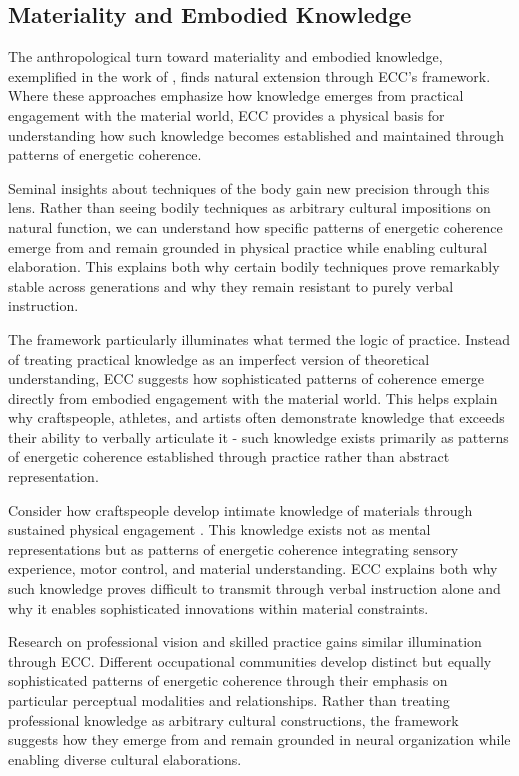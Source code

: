 \subsection{Materiality and Embodied Knowledge}

The anthropological turn toward materiality and embodied knowledge, exemplified in the work of \cite{ingold2013making,jackson1989knowledge,csordas1990embodiment}, finds natural extension through ECC's framework. Where these approaches emphasize how knowledge emerges from practical engagement with the material world, ECC provides a physical basis for understanding how such knowledge becomes established and maintained through patterns of energetic coherence.

Seminal insights about techniques of the body \cite{mauss1935techniques} gain new precision through this lens. Rather than seeing bodily techniques as arbitrary cultural impositions on natural function, we can understand how specific patterns of energetic coherence emerge from and remain grounded in physical practice while enabling cultural elaboration. This explains both why certain bodily techniques prove remarkably stable across generations and why they remain resistant to purely verbal instruction.

The framework particularly illuminates what \cite{bourdieu1990logic} termed the logic of practice. Instead of treating practical knowledge as an imperfect version of theoretical understanding, ECC suggests how sophisticated patterns of coherence emerge directly from embodied engagement with the material world. This helps explain why craftspeople, athletes, and artists often demonstrate knowledge that exceeds their ability to verbally articulate it - such knowledge exists primarily as patterns of energetic coherence established through practice rather than abstract representation.

Consider how craftspeople develop intimate knowledge of materials through sustained physical engagement \cite{bunn1999nomads,marchand2010making}. This knowledge exists not as mental representations but as patterns of energetic coherence integrating sensory experience, motor control, and material understanding. ECC explains both why such knowledge proves difficult to transmit through verbal instruction alone and why it enables sophisticated innovations within material constraints.

Research on professional vision and skilled practice \cite{goodwin1994professional} gains similar illumination through ECC. Different occupational communities develop distinct but equally sophisticated patterns of energetic coherence through their emphasis on particular perceptual modalities and relationships. Rather than treating professional knowledge as arbitrary cultural constructions, the framework suggests how they emerge from and remain grounded in neural organization while enabling diverse cultural elaborations.

